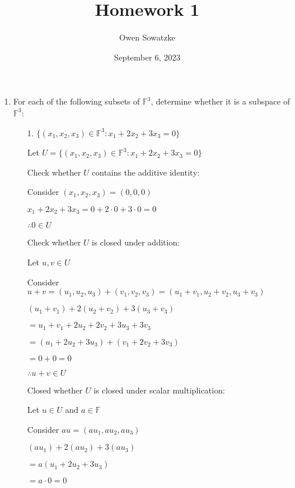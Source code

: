 \documentclass{article}
\title{Homework 1}
\author{Owen Sowatzke}
\date{September 6, 2023}
\begin{document}
	\setlength{\abovedisplayskip}{0pt}
	\setlength{\belowdisplayskip}{0pt}
		\setlength{\abovedisplayshortskip}{0pt}
	\setlength{\belowdisplayshortskip}{0pt}
	\doublespacing
	\maketitle
	
	\begin{enumerate}[nolistsep]
	
		\item For each of the following subsets of $\mathbb{F}^3$, determine whether it is a subspace of $\mathbb{F}^3$:
		
		\begin{enumerate}[nolistsep]
		
			\item[1.] ${\{(x_1, x_2, x_3) \in \mathbb{F}^3 : x_1 + 2x_2 + 3x_3 = 0 \}}$
			
			Let $U = {\{(x_1, x_2, x_3) \in \mathbb{F}^3 : x_1 + 2x_2 + 3x_3 = 0 \}}$
			
			Check whether $U$ contains the additive identity:
			
			Consider $(x_1, x_2, x_3) = (0, 0, 0)$
			
			$x_1 + 2x_2 + 3x_3 = 0 + 2 \cdot 0 + 3 \cdot 0 = 0$
			
			$\therefore 0 \in U$
			
			Check whether $U$ is closed under addition:
			
			Let $u,v \in U$
			
			Consider $u + v = (u_1, u_2, u_3) + (v_1, v_2, v_3) = (u_1 + v_1, u_2 + v_2, u_3 + v_3)$
			
			$(u_1 + v_1) + 2(u_2 + v_2) + 3(u_3 + v_3)$
			
			$ = u_1 + v_1 + 2u_2 + 2v_2 + 3u_3 + 3v_3$
			
			$ = (u_1 + 2u_2 + 3u_3) + (v_1 + 2v_2 + 3v_3)$
			
			$ = 0 + 0 = 0$
			
			$\therefore u + v \in U$
			
			Closed whether $U$ is closed under scalar multiplication:
			
			Let $u \in U$ and $a \in \mathbb{F}$
			
			Consider $au = (au_1, au_2, au_3)$
			
			$(au_1) + 2(au_2) + 3(au_3)$
			
			$ = a(u_1 + 2u_2 + 3u_3)$
			
			$ = a \cdot 0 = 0$
			

\end{enumerate}
\end{enumerate}
\end{document}
